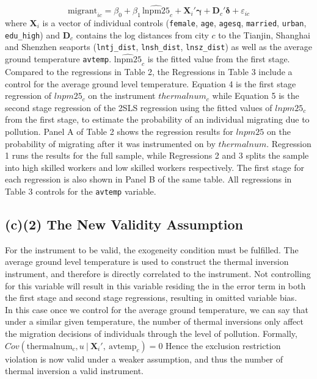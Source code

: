 \documentclass[11pt]{article}
\begin{document}
\begin{equation}
\label{eq:ols}
\text{migrant}_{ic} = \beta_0 + \beta_1 \,\widehat{\text{lnpm25}}_c + \mathbf{X}_i'\boldsymbol{\gamma} + \mathbf{D}_c'\boldsymbol{\delta} + \varepsilon_{ic}\end{equation}
where $\mathbf{X}_i$ is a vector of individual controls (\texttt{female}, \texttt{age}, \texttt{agesq}, \texttt{married}, \texttt{urban}, \texttt{edu\_high}) and $\mathbf{D}_c$ contains the log distances from city $c$ to the Tianjin, Shanghai and Shenzhen seaports (\texttt{lntj\_dist}, \texttt{lnsh\_dist}, \texttt{lnsz\_dist}) as well as the average ground temperature \texttt{avtemp}. $\widehat{\text{lnpm25}}_c$ is the fitted value from the first stage.\\

\noindent Compared to the regressions in Table 2, the Regressions in Table 3 include a control for the average ground level temperature. Equation 4 is the first stage regression of $lnpm25_c$ on the instrument $thermalnum_c$ while Equation 5 is the second stage regression of the 2SLS regression using the fitted values of $lnpm25_c$ from the first stage, to estimate the probability of an individual migrating due to pollution. Panel A of Table 2 shows the regression results for $lnpm25$ on the probability of migrating after it was instrumented on by $thermalnum$. Regression 1 runs the results for the full sample, while Regressions 2 and 3 splits the sample into high skilled workers and low skilled workers respectively. The first stage for each regression is also shown in Panel B of the same table. All regressions in Table 3 controls for the \texttt{avtemp} variable.

\subsection*{(c)(2) The New Validity Assumption}
For the instrument to be valid, the exogeneity condition must be fulfilled. The average ground level temperature is used to construct the thermal inversion instrument, and therefore is directly correlated to the instrument. Not controlling for this variable will result in this variable residing the in the error term in both the first stage and second stage regressions, resulting in omitted variable bias.\\


\noindent In this case once we control for the average ground temperature, we can say that under a similar given temperature, the number of thermal inversions only affect the migration decisions of individuals through the level of pollution. Formally, $Cov(\text{thermalnum}_c,u\ |\  \mathbf{X}_i',\ \text{avtemp}_c )=0$ Hence the exclusion restriction violation is now valid under a weaker assumption, and thus the number of thermal inversion a valid instrument. 
\end{document}
